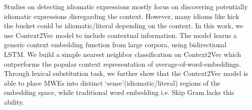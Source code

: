 Studies on detecting idiomatic expressions mostly focus on discovering potentially idiomatic expressions disregarding the context. However, many idioms like kick the bucket could be idiomatic/literal depending on the context. In this work, we use Context2Vec model to include contextual information. The model learns a generic context embedding function from large corpora, using bidirectional LSTM. We build a simple nearest neighbor classification on Context2Vec which outperforms the popular context representation of average-of-word-embeddings. Through lexical substitution task, we further show that the Context2Vec model is able to place MWEs into distinct ‘sense'(idiomatic/literal) regions of the embedding space, while traditional word embedding i.e. Skip Gram lacks this ability.
